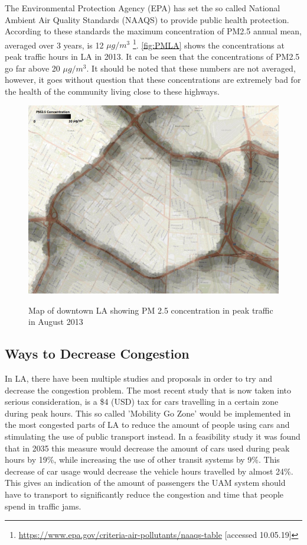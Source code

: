 The Environmental Protection Agency (EPA) has set the so called National Ambient Air Quality Standards (NAAQS) to provide public health protection. According to these standards the maximum concentration of PM2.5 annual mean, averaged over 3 years,
is 12 $\mu g / m^3$ \footnote{\url{https://www.epa.gov/criteria-air-pollutants/naaqs-table} [accessed 10.05.19]}. \autoref{fig:PMLA} shows the concentrations at peak traffic hours in LA in 2013. It can be seen that the concentrations of PM2.5 go far above 20 $\mu g / m^3$. It should be noted that these numbers are not averaged, however, it goes without question that these concentrations are extremely bad for the health of the community living close to these highways.  

\begin{figure}[h]
    \centering
    \includegraphics[width=0.75\linewidth]{Figures/PMLA.png}
    \captionsetup{justification=centering}
    \caption{Map of downtown LA showing PM 2.5 concentration in peak traffic in August 2013} \cite{pmlevelLA}
    \label{fig:PMLA}
\end{figure}

\subsection{Ways to Decrease Congestion}
\label{decrease}
In LA, there have been multiple studies and proposals in order to try and decrease the congestion problem. The most recent study that is now taken into serious consideration, is a \$4 (USD) tax for cars travelling in a certain zone during peak hours. This so called 'Mobility Go Zone' \cite{mobilitygo} would be implemented in the most congested parts of LA to reduce the amount of people using cars and stimulating the use of public transport instead. In a feasibility study it was found that in 2035 this measure would decrease the amount of cars used during peak hours by 19\%, while increasing the use of other transit systems by 9\%. This decrease of car usage would decrease the vehicle hours travelled by almost 24\%. This gives an indication of the amount of passengers the UAM system should have to transport to significantly reduce the congestion and time that people spend in traffic jams. 

